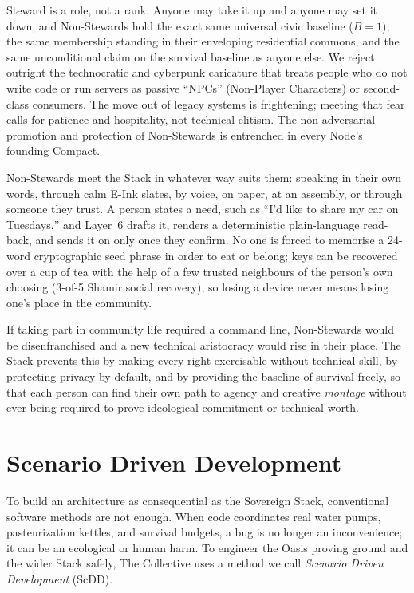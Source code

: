 Steward is a role, not a rank. Anyone may take it up and anyone may set it down, and Non-Stewards hold the exact same universal civic baseline ($B = 1$), the same membership standing in their enveloping residential commons, and the same unconditional claim on the survival baseline as anyone else. We reject outright the technocratic and cyberpunk caricature that treats people who do not write code or run servers as passive ``NPCs'' (Non-Player Characters) or second-class consumers. The move out of legacy systems is frightening; meeting that fear calls for patience and hospitality, not technical elitism. The non-adversarial promotion and protection of Non-Stewards is entrenched in every Node's founding Compact.

Non-Stewards meet the Stack in whatever way suits them: speaking in their own words, through calm E-Ink slates, by voice, on paper, at an assembly, or through someone they trust. A person states a need, such as ``I'd like to share my car on Tuesdays,'' and Layer~6 drafts it, renders a deterministic plain-language read-back, and sends it on only once they confirm. No one is forced to memorise a 24-word cryptographic seed phrase in order to eat or belong; keys can be recovered over a cup of tea with the help of a few trusted neighbours of the person's own choosing (3-of-5 Shamir social recovery), so losing a device never means losing one's place in the community.

If taking part in community life required a command line, Non-Stewards would be disenfranchised and a new technical aristocracy would rise in their place. The Stack prevents this by making every right exercisable without technical skill, by protecting privacy by default, and by providing the baseline of survival freely, so that each person can find their own path to agency and creative \textit{montage} without ever being required to prove ideological commitment or technical worth.

\section{Scenario Driven Development}

To build an architecture as consequential as the Sovereign Stack, conventional software methods are not enough. When code coordinates real water pumps, pasteurization kettles, and survival budgets, a bug is no longer an inconvenience; it can be an ecological or human harm. To engineer the Oasis proving ground and the wider Stack safely, The Collective uses a method we call \textit{Scenario Driven Development} (ScDD).

